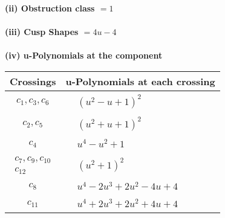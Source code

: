\documentclass[1p]{elsarticle_modified}
\theoremstyle{definition}
\begin{document}
\flushleft \textbf{(ii) Obstruction class $= 1$}\\~\\
\flushleft \textbf{(iii) Cusp Shapes $= 4 u-4$}\\~\\
\newpage\renewcommand{\arraystretch}{1}
\flushleft \textbf{(iv) u-Polynomials at the component}\newline \\
\begin{tabular}{m{50pt}|m{274pt}}
Crossings & \hspace{64pt}u-Polynomials at each crossing \\
\hline $$\begin{aligned}c_{1},c_{3},c_{6}\end{aligned}$$&$\begin{aligned}
&(u^2- u+1)^2
\end{aligned}$\\
\hline $$\begin{aligned}c_{2},c_{5}\end{aligned}$$&$\begin{aligned}
&(u^2+u+1)^2
\end{aligned}$\\
\hline $$\begin{aligned}c_{4}\end{aligned}$$&$\begin{aligned}
&u^4- u^2+1
\end{aligned}$\\
\hline $$\begin{aligned}c_{7},c_{9},c_{10}\\c_{12}\end{aligned}$$&$\begin{aligned}
&(u^2+1)^2
\end{aligned}$\\
\hline $$\begin{aligned}c_{8}\end{aligned}$$&$\begin{aligned}
&u^4-2 u^3+2 u^2-4 u+4
\end{aligned}$\\
\hline $$\begin{aligned}c_{11}\end{aligned}$$&$\begin{aligned}
&u^4+2 u^3+2 u^2+4 u+4
\end{aligned}$\\
\hline
\end{tabular}\\~\\
\end{document}
